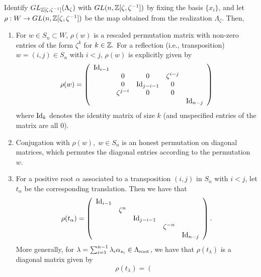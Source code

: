 \begin{lemma}\label{lemma-action matrix}
    Identify $GL_{\mathbb{Z}[\zeta, \zeta^{-1}]}(\Lambda_{\zeta})$ with $GL(n,\mathbb{Z}[\zeta, \zeta^{-1}])$ by fixing the basis $\{x_i\}$, and let $\rho: W \rightarrow GL(n,\mathbb{Z}[\zeta, \zeta^{-1}])$ be the map obtained from the realization $\Lambda_{\zeta}$. Then,
    \begin{enumerate}
        \item For $w \in S_n \subset W$, $\rho(w)$ is a rescaled permutation matrix with non-zero entries of the form $\zeta^k$ for $k \in \mathbb{Z}.$ 
        For a reflection (i.e., transposition) $w= (i,j) \in S_n$ with $i < j$, $\rho(w)$ is explicitly given by 
        \[\rho(w)=
        \left({\begin{array}{ccccccccccc}
        \operatorname{Id}_{i-1} &    & & &  \\
           &0  &0  & \zeta^{i-j} &\\
           &0    &\operatorname{Id}_{j-i-1} &0   &\\
           &\zeta^{j-i}   &0   &0   & \\
           &    &   &   &\operatorname{Id}_{n-j}\\
           \end{array} }  \right)
        \]
         where $\operatorname{Id}_k$ denotes the identity matrix of size $k$ (and unspecified entries of the matrix are all 0).
        \item Conjugation with $\rho(w), \; w \in S_n$ is an honest permutation on diagonal matrices, which permutes the diagonal entries according to the permutation $w$.
        \item For a positive root $\alpha$ associated to a transposition $(i,j)$ in $S_n$ with $i<j$, let $t_{\alpha}$ be the corresponding translation. Then we have that \[ \rho(t_{\alpha})= 
          \left({\begin{array}{ccccccccccc}
        \operatorname{Id}_{i-1}   \\
           &\zeta^{n} \\
           &    &\operatorname{Id}_{j-i-1}\\
           &    &   &\zeta^{-n} & \\
           &    &   &   &\operatorname{Id}_{n-j}\\
           \end{array} }  \right).
        \]
        More generally, for $\lambda=\sum_{i=1}^{n-1}\lambda_i\alpha_{s_i} \in \Lambda_{\operatorname{root}}$, we have that $\rho(t_{\lambda})$ is a diagonal matrix given by
        \[ \rho(t_{\lambda})= 
          \left({\begin{array}{ccccccccccc}

\end{array}}\]
\end{enumerate}
\end{lemma}
